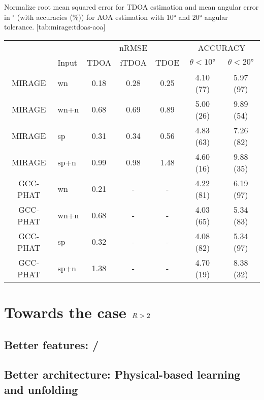 \begin{table}[ht!]
    \begin{sidecaption}{%
        Normalize root mean squared error for TDOA estimation and mean angular error in ${}^\circ$ (with accuracies ($\%$))
        for AOA estimation with $\ang{10}$ and $\ang{20}$ angular tolerance.
    }[tab:mirage:tdoas-aoa]
    \centering
    \footnotesize
    \begin{tabular}{cl|ccc|cc}
    \toprule
                &         &          & nRMSE        &                   &\multicolumn{2}{c}{ACCURACY}  \\
                & Input   &    \scriptsize{TDOA}  	&   \scriptsize{iTDOA} 		 &     \scriptsize{TDOE} 		 & $\theta<\ang{10}$ &  $\theta<\ang{20}$ \\
    \midrule
    MIRAGE      &   wn    & 0.18    & 0.28  & 0.25 	& 4.10 (77)	& 5.97 (97) \\
    MIRAGE      &   wn+n  & 0.68    & 0.69  & 0.89 	& 5.00 (26)	& 9.89 (54) \\
    MIRAGE      &   sp    & 0.31    & 0.34  & 0.56  & 4.83 (63)	& 7.26 (82) \\
    MIRAGE      &   sp+n  & 0.99    & 0.98  & 1.48 	& 4.60 (16)	& 9.88 (35) \\
    GCC-PHAT    &   wn    & 0.21    & -     & -		& 4.22 (81) & 6.19 (97) \\
    GCC-PHAT    &   wn+n  & 0.68    & -     & -		& 4.03 (65) & 5.34 (83) \\
    GCC-PHAT    &   sp 	  & 0.32    & -     & -		& 4.08 (82) & 5.34 (97) \\
    GCC-PHAT    &   sp+n  & 1.38    & -     & -		& 4.70 (19) & 8.38 (32) \\
    \bottomrule
    \end{tabular}
    \end{sidecaption}
\end{table}

\section{Towards the case $R > 2$}

\subsection{Better features: \RTF/}

\subsection{Better architecture: Physical-based learning and unfolding}

